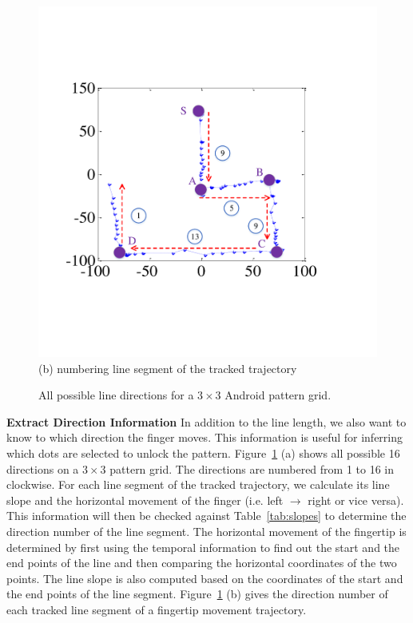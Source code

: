 \begin{figure}[!t]
{\begin{minipage}[t]{0.23\textwidth}
                \includegraphics[width=\textwidth]{fig/7-2.pdf}\\
                \centering \footnotesize (b) numbering line segment of the tracked trajectory
                \end{minipage}
            }
            \caption{All possible line directions for a $3 \times 3$ Android pattern grid.}
            \label{fig:fig7}
        \end{figure}

       \noindent \textbf{Extract Direction Information}
       In addition to the line length, we also want to know to which
       direction the finger moves. This information is useful for inferring which dots are selected to unlock the pattern.
       Figure~\ref{fig:fig7} (a) shows all possible 16
        directions on a $3 \times 3$ pattern grid. The
        directions are numbered from 1 to 16 in clockwise.
        For each line segment of the tracked trajectory, we calculate its line slope and the horizontal movement of the finger (i.e. left $\rightarrow$ right or vice versa).
        This information will then be checked against Table~\ref{tab:slopes} to determine the direction number of the line segment.
         The horizontal movement of the fingertip is determined by first using the temporal information to find out the start and the end points of the line and then comparing the horizontal coordinates of the two points.
        The line slope is also computed based on the coordinates of the
       start and the end points of the
        line segment.
        Figure~\ref{fig:fig7} (b) gives the direction number of each
        tracked line segment of a fingertip movement trajectory.

